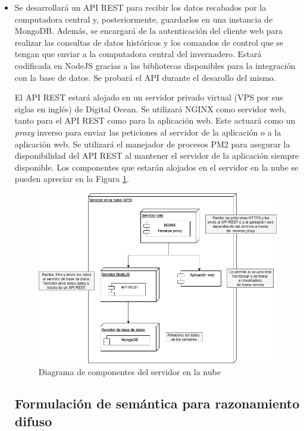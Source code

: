 \begin{itemize}
	\item Se desarrollará un API REST para recibir los datos recabados por la computadora central y, posteriormente, guardarlos en una instancia de MongoDB. Además, se encargará de la autenticación del cliente web para realizar las consultas de datos históricos y los comandos de control que se tengan que enviar a la computadora central del invernadero. Estará codificada en NodeJS gracias a las bibliotecas disponibles para la integración con la base de datos. Se probará el API durante el desarollo del mismo.

	El API REST estará alojado en un servidor privado virtual (VPS por sus siglas en inglés) de Digital Ocean. Se utilizará NGINX como servidor web, tanto para el API REST como para la aplicación web. Este actuará como un \textit{proxy} inverso para enviar las peticiones al servidor de la aplicación o a la aplicación web. Se utilizará el manejador de procesos PM2 para asegurar la disponibilidad del API REST al mantener el servidor de la aplicación siempre disponible. Los componentes que estarán alojados en el servidor en la nube se pueden apreciar en la Figura \ref{fig:componentes_vps}.

	\begin{figure}[!ht]
		\centering
		\includegraphics[width=.95\linewidth]{imagenes/diagramas/componentes_vps.png}
		\caption{Diagrama de componentes del servidor en la nube}
		\label{fig:componentes_vps}
	\end{figure}



\subsection{Formulación de semántica para razonamiento difuso}

\end{itemize}
